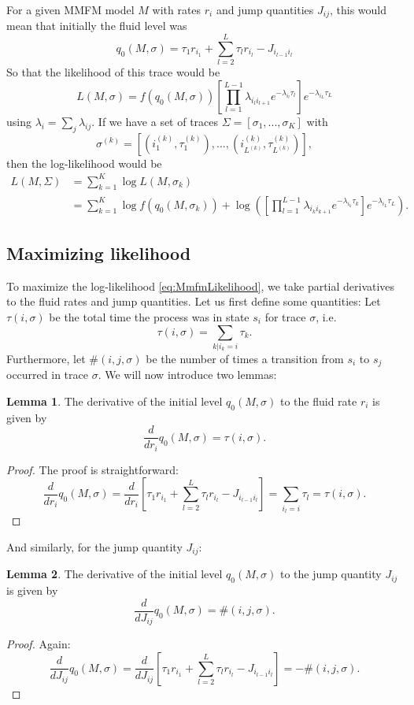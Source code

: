 \documentclass[a4paper]{thesis}
\theoremstyle{definition}
\newtheorem{lemma}{Lemma}[chapter]  %
\begin{document}
	For a given MMFM model $M$ with rates $r_i$ and jump quantities $J_{ij}$, this would mean that initially the fluid level was
	\begin{equation}\label{eq:initialLevelDefinition}
	q_0(M,\sigma)=\tau_1r_{i_1}+\sum\limits_{l=2}^{L}\tau_lr_{i_l}-J_{i_{l-1}i_l}
	\end{equation}
	So that the likelihood of this trace would be
	$$
	L(M,\sigma)=f(q_0(M,\sigma))\left[\prod\limits_{l=1}^{L-1}\lambda_{i_li_{l+1}}e^{-\lambda_{i_l}\tau_l}\right]e^{-\lambda_{i_L}\tau_L}
	$$
	using $\lambda_i=\sum_j\lambda_{ij}$.
	If we have a set of traces $\Sigma=[\sigma_1,...,\sigma_K]$ with \[
	\sigma^{(k)}=\left[(i_1^{(k)},\tau_1^{(k)}),...,(i_{L^{(k)}}^{(k)},\tau_{L^{(k)}}^{(k)})\right],
	\]
	then the log-likelihood would be
	\begin{equation}\label{eq:MmfmLikelihood}
	\begin{split}
	L(M,\Sigma)&=\sum\limits_{k=1}^K\log L(M,\sigma_k)\\
	&=\sum\limits_{k=1}^K\log f(q_0(M,\sigma_k))+\log\left(\left[\prod\limits_{l=1}^{L-1}\lambda_{i_ki_{k+1}}e^{-\lambda_{i_k}\tau_k}\right]e^{-\lambda_{i_L}\tau_L}\right).
	\end{split}
	\end{equation}
	
	\subsection{Maximizing likelihood}
	To maximize the log-likelihood \eqref{eq:MmfmLikelihood}, we take partial derivatives to the fluid rates and jump quantities.
	Let us first define some quantities:
	Let $\tau(i,\sigma)$ be the total time the process was in state $s_i$ for trace $\sigma$, i.e.
	$$
	\tau(i,\sigma)=\sum\limits_{k|i_k=i}\tau_k.
	$$
	Furthermore, let $\#(i,j,\sigma)$ be the number of times a transition from $s_i$ to $s_j$ occurred in trace $\sigma$.
	We will now introduce two lemmas:
	\begin{lemma}
		The derivative of the initial level $q_0(M,\sigma)$ to the fluid rate $r_i$ is given by
		\[
		\frac{d}{dr_i}q_0(M,\sigma)=\tau(i,\sigma).
		\]
		\begin{proof}
			The proof is straightforward:
			\[
			\frac{d}{dr_i}q_0(M,\sigma)=\frac{d}{dr_i}\left[\tau_1r_{i_1}+\sum\limits_{l=2}^{L}\tau_lr_{i_l}-J_{i_{l-1}i_l}\right]=\sum\limits_{i_l=i}\tau_l=\tau(i,\sigma).
			\]
		\end{proof}
	\end{lemma}
	And similarly, for the jump quantity $J_{ij}$:
	\begin{lemma}
		The derivative of the initial level  $q_0(M,\sigma)$ to the jump quantity $J_{ij}$ is given by
		\[
		\frac{d}{dJ_{ij}}q_0(M,\sigma)=\#(i,j,\sigma).
		\]
		\begin{proof}
			Again:
			\[
			\frac{d}{dJ_{ij}}q_0(M,\sigma)=\frac{d}{dJ_{ij}}\left[\tau_1r_{i_1}+\sum\limits_{l=2}^{L}\tau_lr_{i_l}-J_{i_{l-1}i_l}\right]=-\#(i,j,\sigma).
			\]
		\end{proof}
	\end{lemma}
	
\end{document}
